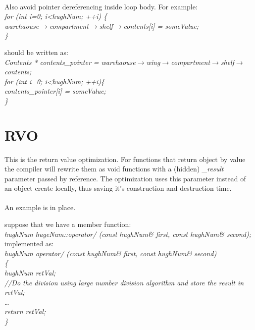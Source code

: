 \documentclass{article}
\begin{document}
 \paragraph{}
 Also avoid pointer dereferencing inside loop body.
 For example:\\
 \emph{
 for (int i=0;  i<hughNum; ++i) \{ \\
 warehaouse$\to$compartment$\to$shelf$\to$contents[i] = someValue; \\
 \}
 }

 should be written as:\\
 \emph{
 Contents * contents\_pointer = warehaouse$\to$wing$\to$compartment$\to$shelf$\to$contents;\\
 for (int i=0; i<hughNum; ++i)\{ \\
 contents\_pointer[i] = someValue; \\
 \}
 }
 
\section{RVO}
 \paragraph{}
 This is the return value optimization.  For functions that return object by value the compiler will rewrite them as void functions with a (hidden) \emph{\_result} parameter passed by reference. The optimization uses this parameter instead of an object create locally, thus saving it's construction and destruction time.

 \paragraph{}
 An example is in place.

 suppose that we have a member function:\\
 \emph{hughNum hugeNum::operator/ (const hughNum\& first, const hughNum\& second);}\\

 implemented as:\\
 \emph{
 hughNum operator/ (const hughNum\& first,  const hughNum\& second)\\
 \{\\
     hughNum retVal;\\
 //Do the division using large number division algorithm and store the result in retVal;\\
 \ldots \\
     return retVal;\\
 \}\\
 }
 
\end{document}
